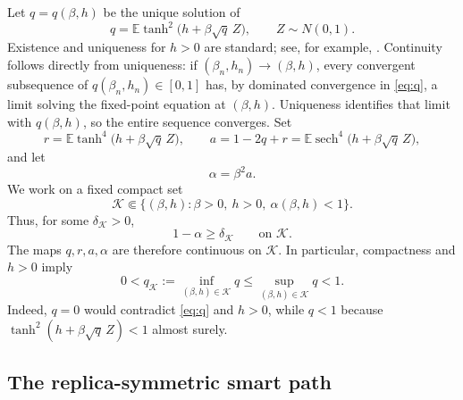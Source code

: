 \documentclass[11pt]{article}
\numberwithin{equation}{section}
\theoremstyle{plain}
\theoremstyle{definition}
\newcommand{\E}{\mathbb E}
\newcommand{\1}{\mathbf 1}
\newcommand{\sech}{\operatorname{sech}}
\newcommand{\cK}{\mathcal K}
\begin{document}
Let $q=q(\beta,h)$ be the unique solution of
\begin{equation}
 q=\E\tanh^2\bigl(h+\beta\sqrt q\,Z\bigr),
 \qquad Z\sim N(0,1).
 \label{eq:q}
\end{equation}
Existence and uniqueness for $h>0$ are standard; see, for example,
\cite[Proposition~1.3.8]{Talagrand}.  Continuity follows directly from
uniqueness: if $(\beta_n,h_n)\to(\beta,h)$, every convergent
subsequence of $q(\beta_n,h_n)\in[0,1]$ has, by dominated convergence
in \eqref{eq:q}, a limit solving the fixed-point equation at
$(\beta,h)$.  Uniqueness identifies that limit with $q(\beta,h)$, so
the entire sequence converges.
Set
\begin{equation}
 r=\E\tanh^4\bigl(h+\beta\sqrt q\,Z\bigr),\qquad
 a=1-2q+r=\E\sech^4\bigl(h+\beta\sqrt q\,Z\bigr),
 \label{eq:ra}
\end{equation}
and let
\begin{equation}
 \alpha=\beta^2a.
 \label{eq:alpha}
\end{equation}
We work on a fixed compact set
\begin{equation}
 \cK\Subset\{(\beta,h):\beta>0,\ h>0,\ \alpha(\beta,h)<1\}.
 \label{eq:K}
\end{equation}
Thus, for some $\delta_{\cK}>0$,
\begin{equation}
 1-\alpha\ge\delta_{\cK}
 \qquad\text{on }\cK.
 \label{eq:delta}
\end{equation}
The maps $q,r,a,\alpha$ are therefore continuous on $\cK$.  In
particular, compactness and $h>0$ imply
\begin{equation}
 0<q_{\cK}:=\inf_{(\beta,h)\in\cK}q
 \le \sup_{(\beta,h)\in\cK}q<1.
 \label{eq:qcompact}
\end{equation}
Indeed, $q=0$ would contradict \eqref{eq:q} and $h>0$, while
$q<1$ because $\tanh^2(h+\beta\sqrt q\,Z)<1$ almost surely.

\subsection{The replica-symmetric smart path}
\end{document}
